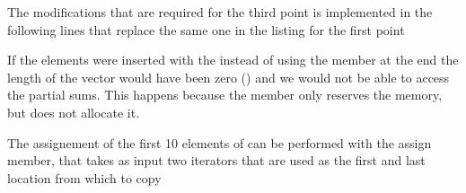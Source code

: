 The modifications that are required for the third point is implemented in the
following lines that replace the same one in the listing for the first point
\lstset{basicstyle=\scriptsize\sf}

\lstset{basicstyle=\sf}

If the elements were inserted with the  instead of using the
 member at the end the length of the vector would have been
zero () and we would not be able to access the partial
sums. This happens because the  member only reserves the memory,
but does not allocate it.

The assignement of the first 10 elements of  can be performed with
the assign member, that takes as input two iterators that are used as the first
and last location from which to copy
\lstset{basicstyle=\scriptsize\sf}

\lstset{basicstyle=\sf}

